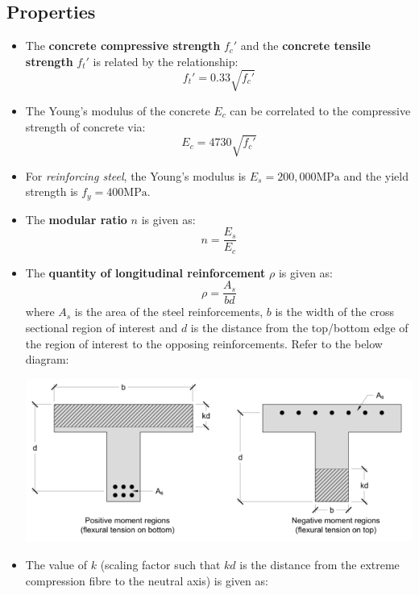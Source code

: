 \documentclass{article}
\begin{document}
\subsection{Properties}
\begin{itemize}
    \item The \textbf{concrete compressive strength} $f_c'$ and the \textbf{concrete tensile strength} $f_t'$ is related by the relationship:
    \begin{equation}
        f_t' = 0.33\sqrt{f_c'}
        \label{eq:}
    \end{equation}
    \item The Young's modulus of the concrete $E_c$ can be correlated to the compressive strength of concrete via:
    \begin{equation}
        E_c = 4730\sqrt{f_c'}
        \label{eq:}
    \end{equation}
    \item For \textit{reinforcing steel}, the Young's modulus is $E_s = 200,000\si{\mega\pascal}$ and the yield strength is $f_y = 400\si{\mega\pascal}$. 
    \item The \textbf{modular ratio} $n$ is given as:
    \begin{equation}
        n = \frac{E_s}{E_c}
        \label{eq:}
    \end{equation}
    \item The \textbf{quantity of longitudinal reinforcement} $\rho$ is given as:
    \begin{equation}
        \rho = \frac{A_s}{bd}
        \label{eq:}
    \end{equation}
    where $A_s$ is the area of the steel reinforcements, $b$ is the width of the cross sectional region of interest and $d$ is the distance from the top/bottom edge of the region of interest to the opposing reinforcements. Refer to the below diagram:
    \begin{center}
        \includegraphics[width=0.7\linewidth]{concrete_cross_section.png}
    \end{center}
    \item The value of $k$ (scaling factor such that $kd$ is the distance from the extreme compression fibre to the neutral axis) is given as:

\end{itemize}
\end{document}
